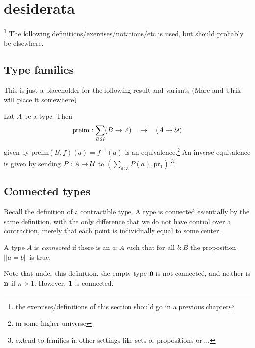 \label{ch:groups}

\section{desiderata}\footnote{the exercises/definitions of this section should go in a previous chapter}
The following definitions/exercises/notations/etc is used, but should probably be elsewhere.



\subsection{Type families}
\label{sec:typefam}

This is just a placeholder for the following result and variants (Marc and Ulrik will place it somewhere)
\begin{lemma}
\label{lem:typefamiliesandfibrations}
  Lat $A$ be a type.  Then
$$\mathrm{preim}:\sum_{B:\mathcal{U}}(B\to A)\quad\to\quad (A\to\mathcal{U}) 
$$ 
given by $\mathrm{preim}(B,f)(a)=f^{-1}(a)$ is an equivalence.\footnote{in some higher universe}
An inverse equivalence is given by sending $P:A\to\mathcal{U}$ to $(\sum_{a:A}P(a), \mathrm{pr_1})$.\footnote{extend to families in other settings like sets or propositions or ...}
\end{lemma}


\subsection{Connected types}
\label{sec:connectedtypes}
Recall the definition of a contractible type.  A type is connected essentially by the same definition, with the only difference that we do not have control over a contraction, merely that each point is individually equal to some center.
\begin{definition}\label{def:connected}
A type $A$ is \emph{connected} if there is an $a:A$ such that for all $b:B$ the proposition $||a=b||$ is true.  
\end{definition}
Note that under this definition, the empty type $\mathbf{0} $ is not connected, and neither is $\mathbf{n} $ if $n>1$. However, $\mathbf{1} $ is connected.

